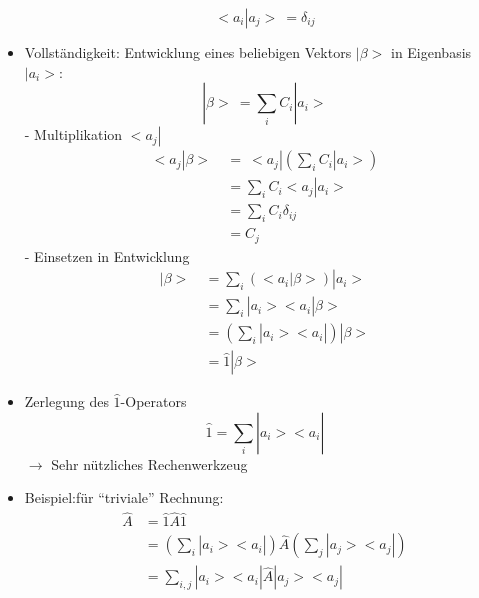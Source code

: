 \documentclass[10pt,article,colorback,accentcolor=tud9d]{scrartcl}
\begin{document}
\begin{fleqn}
\begin{itemize}
    \begin{equation}
    <a_i\left.\right|a_j> \ = \delta_{ij}
    \end{equation}
  \item Vollständigkeit: Entwicklung eines beliebigen Vektors $\left.\right|\beta>$ in Eigenbasis $\left.\right|a_i>$:
    \begin{equation}
    \left.\right|\beta> \ = \sum_i C_i \left.\right|a_i >
    \end{equation}
    - Multiplikation $<a_j\left.\right|$
      \begin{equation}
      \begin{aligned}
      <a_j\left.\right|\beta> \ &= \ <a_j\left.\right|\left(\sum_i C_i\left.\right|a_i>\right)\\
      &=\sum_iC_i<a_j\left.\right|a_i>\\
      &=\sum_iC_i \delta_{ij}\\
      &=C_j
      \end{aligned}
      \end{equation}
    - Einsetzen in Entwicklung
    \begin{equation}
    \begin{aligned}
      \left.\right|\beta> \ &= \sum_i\left(<a_i\left.\right|\beta>\right) \left.\right|a_i>\\
      &=\sum_i\left.\right|a_i><a_i\left.\right|\beta>\\
      &=\left(\sum_i\left.\right|a_i><a_i\left.\right|\right)\left.\right|\beta>\\
      &=\hat{1}\left.\right|\beta>
    \end{aligned}
    \end{equation}
  \item Zerlegung des $\hat{1}$-Operators
    \begin{equation}
    \hat{1}= \sum_i \left.\right|a_i><a_i\left.\right|
    \end{equation}
    $\rightarrow$ Sehr nützliches Rechenwerkzeug
  \item Beispiel:für "`triviale"' Rechnung:
    \begin{equation}
    \begin{aligned}
    \hat{A} &= \hat{1}\hat{A}\hat{1}\\
    &=\left(\sum_i\left.\right|a_i><a_i\left.\right|\right)\hat{A}\left(\sum_j\left.\right|a_j><a_j\left.\right|\right)\\
    &=\sum_{i,j}\left.\right|a_i><a_i\left.\right|\hat{A}\left.\right|a_j><a_j\left.\right|
    \end{aligned}

\end{equation}
\end{itemize}
\end{fleqn}
\end{document}
